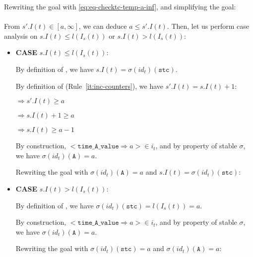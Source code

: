 \documentclass[dvipsnames,12pt]{article}
\begin{document}
\begin{niproof}
\begin{enumerate}
\begin{enumerate}
\begin{enumerate}
\begin{itemize}
          Rewriting the goal with \eqref{eq:eq-checktc-temp-a-inf},
          and simplifying the goal:\\
          \\

          From $s'.I(t)\in[a,\infty]$, we can deduce
          $a\le{}s'.I(t)$. Then, let us perform case analysis on
          $s.I(t)\le{}l(I_s(t))$ or $s.I(t)>l(I_s(t))$:
          \begin{itemize}
          \item \textbf{CASE} $s.I(t)\le{}l(I_s(t))$:

            By definition of \upSim, we have
            $s.I(t)=\sigma(id_t)(\texttt{stc})$.

            By definition of \dwSitpn{} (Rule~\ref{it:inc-counters}),
            we have $s'.I(t)=s.I(t)+1$:

            $\Rightarrow{}s'.I(t)\ge{}a$

            $\Rightarrow{}s.I(t)+1\ge{}a$

            $\Rightarrow{}s.I(t)\ge{}a-1$

            By construction,
            ${<}\mathtt{time\_A\_value\Rightarrow}{}a{>}\in{}i_t$,
            and by property of stable $\sigma$, we have
            $\sigma(id_t)(\texttt{A})=a$.

            Rewriting the goal with $\sigma(id_t)(\texttt{A})=a$ and
            $s.I(t)=\sigma(id_t)(\texttt{stc})$:\\ 
            
          \item \textbf{CASE} $s.I(t)>l(I_s(t))$:

            By definition of \upSim, we have
            $\sigma(id_t)(\texttt{stc})=l(I_s(t))=a$.

            By construction,
            ${<}\mathtt{time\_A\_value\Rightarrow}{}a{>}\in{}i_t$,
            and by property of stable $\sigma$, we have
            $\sigma(id_t)(\texttt{A})=a$.

            Rewriting the goal with $\sigma(id_t)(\texttt{stc})=a$ and
            $\sigma(id_t)(\texttt{A})=a$: 
          \end{itemize}
          
        \end{itemize}
      \end{enumerate}
    \end{enumerate}
  \end{enumerate}
\end{niproof}
\end{document}
